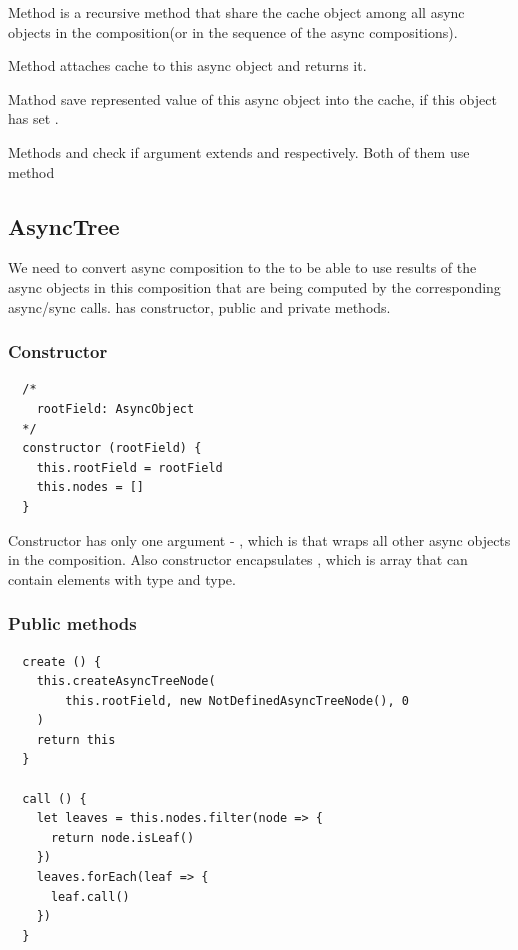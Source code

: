 \documentclass{article}
\begin{document}
Method  is a recursive method that share the cache object among all async objects in the composition(or in the sequence of the async compositions).

Method  attaches cache to this async object and returns it.

Mathod  save represented value of this async object into the cache, if this object has set .

Methods  and  check if argument extends  and  respectively. Both of them use method 

\vspace*{10px}

\subsection{AsyncTree}

We need to convert async composition to the  to be able to use results of the async objects in this composition that are being computed by the corresponding async/sync calls.  has constructor, public and private methods.

\subsubsection{Constructor}

\begin{verbatim}
  /*
    rootField: AsyncObject
  */
  constructor (rootField) {
    this.rootField = rootField
    this.nodes = []
  }
\end{verbatim}

Constructor has only one argument - , which is  that wraps all other async objects in the composition. Also constructor encapsulates , which is array that can contain elements with  type and  type.

\subsubsection{Public methods}

\begin{verbatim}
  create () {
    this.createAsyncTreeNode(
        this.rootField, new NotDefinedAsyncTreeNode(), 0
    )
    return this
  }

  call () {
    let leaves = this.nodes.filter(node => {
      return node.isLeaf()
    })
    leaves.forEach(leaf => {
      leaf.call()
    })
  }
\end{verbatim}
\end{document}
